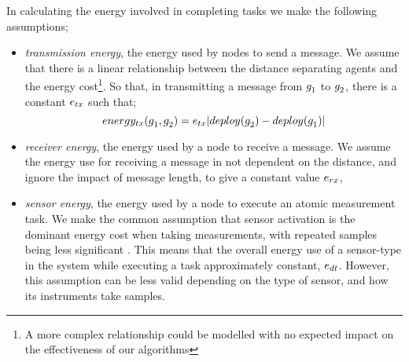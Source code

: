 \newcommand{\formalTransmissionEnergy}[2]{
	\functionFormal{energy_{\symbolTransmission{}{}}}
	{\setAgent{}{} \times \setAgent{}{}}
	{\setRealNumbersPositive{}{}}
}
\newcommand{\functionTransmissionEnergy}[2]{
	\functionSignature{energy_{\symbolTransmission{}{}}}
	{\varAgent{#1}{},\varAgent{#2}{}}
}
\newcommand{\functionTransmissionEnergyIndexed}[2]{
	\functionTransmissionEnergy{\varAgent{i}{}}{\varAgent{i+1}{}}
}
In calculating the energy involved in completing tasks we make the following assumptions;
\begin{itemize}
	\item \textit{transmission energy}, the energy used by nodes to send a message. We assume that there is a linear relationship between the distance separating agents and the energy cost\footnote{A more complex relationship could be modelled with no expected impact on the effectiveness of our algorithms}. So that, in transmitting a message from $g_{1}^{}$ to $g_{2}^{}$, there is a constant $\varTransmissionEnergy{}{}$ such that;
	\begin{equation}
		\functionTransmissionEnergy{1}{2}
		=  \varTransmissionEnergy{}{}\funcSize{\functionDeployment{\varAgent{2}{}}{} - \functionDeployment{\varAgent{1}{}}{}}
	\end{equation}
	\item \textit{receiver energy}, the energy used by a node to receive a message. We assume the energy use for receiving a message in not dependent on the distance, and ignore the impact of message length, to give a constant value $\varReceiverEnergy{}{}$, 
	\item \textit{sensor energy}, the energy used by a node to execute an atomic measurement task. We make the common assumption that sensor activation is the dominant energy cost when taking measurements, with repeated samples being less significant \citep{Razzaque2014}. This means that the overall energy use of a sensor-type in the system while executing a task approximately constant, $\varSensorEnergy{}{}$. However, this assumption can be less valid depending on the type of sensor, and how its instruments take samples.
\end{itemize}
